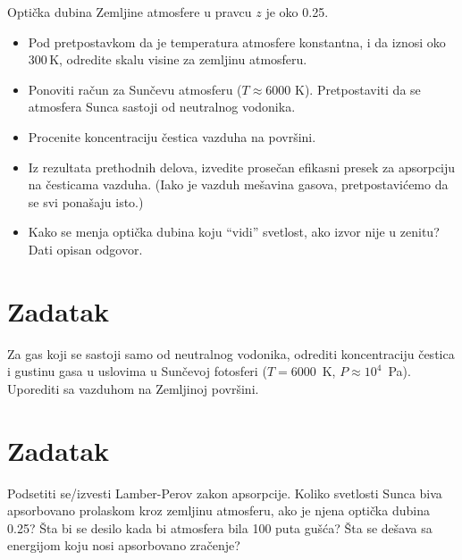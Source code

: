 \documentclass[12pt]{article}
\begin{document}
Opti\v{c}ka dubina Zemljine atmosfere u pravcu $z$ je oko 0.25. 
\begin{itemize}
    \item Pod pretpostavkom da je temperatura atmosfere konstantna, i da iznosi oko 300\,K, odredite skalu visine za zemljinu atmosferu.
    \item Ponoviti ra\v{c}un za Sun\v{c}evu atmosferu ($T \approx 6000$ K). Pretpostaviti da se atmosfera Sunca sastoji od neutralnog vodonika. 
    \item Procenite koncentraciju \v{c}estica vazduha na povr\v{s}ini. 
    \item Iz rezultata prethodnih delova, izvedite prose\v{c}an efikasni presek za apsorpciju na \v{c}esticama vazduha. (Iako je vazduh me\v{s}avina gasova, pretpostavi\'{c}emo da se svi pona\v{s}aju isto.)
    \item Kako se menja opti\v{c}ka dubina koju ``vidi'' svetlost, ako izvor nije u zenitu? Dati opisan odgovor.
\end{itemize}

\section{Zadatak}
Za gas koji se sastoji samo od neutralnog vodonika, odrediti koncentraciju \v{c}estica i gustinu gasa u uslovima u Sun\v{c}evoj fotosferi 
($T=6000$~K, $P \approx 10^4$~Pa). Uporediti sa vazduhom na Zemljinoj površini.

\section{Zadatak}

Podsetiti se/izvesti Lamber-Perov zakon apsorpcije. Koliko svetlosti Sunca biva apsorbovano prolaskom kroz zemljinu atmosferu, ako je njena opti\v{c}ka dubina 0.25? \v{S}ta bi se desilo kada bi atmosfera bila 100 puta gu\v{s}\'{c}a? \v{S}ta se de\v{s}ava sa energijom koju nosi apsorbovano zra\v{c}enje? 
\end{document}
